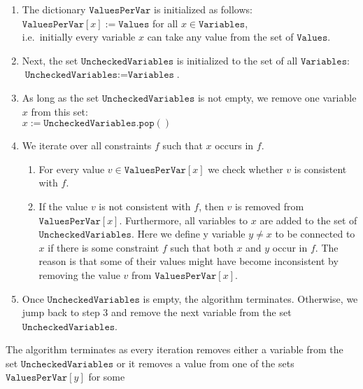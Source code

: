 \begin{enumerate}
\item The dictionary $\texttt{ValuesPerVar}$ is initialized as follows:
      \\[0.2cm]
      \hspace*{1.3cm}
      $\texttt{ValuesPerVar}[x] := \texttt{Values}$ \quad for all $x \in \texttt{Variables}$,
      \\[0.2cm]
      i.e.~initially every variable $x$ can take any value from the set of $\texttt{Values}$.
\item Next, the set $\texttt{UncheckedVariables}$ is initialized to the set of all $\texttt{Variables}$:
      \\[0.2cm]
      \hspace*{1.3cm}
      $\texttt{UncheckedVariables} := \texttt{Variables}$.
\item As long as the set $\texttt{UncheckedVariables}$ is not empty, we remove one variable $x$ from this set:
      \\[0.2cm]
      \hspace*{1.3cm}
      $x := \texttt{UncheckedVariables}.\texttt{pop}()$
\item We iterate over all constraints $f$ such that $x$ occurs in $f$.  
      \begin{enumerate}
      \item For every value $v \in \texttt{ValuesPerVar}[x]$ we check whether $v$ is consistent with $f$.
      \item If the value $v$ is not consistent with $f$, then $v$ is removed from $\texttt{ValuesPerVar}[x]$.
            Furthermore, all variables  to $x$ are added to the set of 
            $\texttt{UncheckedVariables}$.  Here we define y variable $y \not= x$ to be connected to $x$ if
            there is some constraint $f$ such that both $x$ and $y$ occur in $f$.  The reason is that some of
            their values might have become inconsistent by removing the value $v$ from
            $\texttt{ValuesPerVar}[x]$.
      \end{enumerate}
\item Once $\texttt{UncheckedVariables}$ is empty, the algorithm terminates.  Otherwise, we jump back to step 3
      and remove the next variable from the set $\texttt{UncheckedVariables}$.
\end{enumerate}
The algorithm terminates as every iteration removes either a variable from the set
$\texttt{UncheckedVariables}$ or it removes a value from one of the sets $\texttt{ValuesPerVar}[y]$ for some
